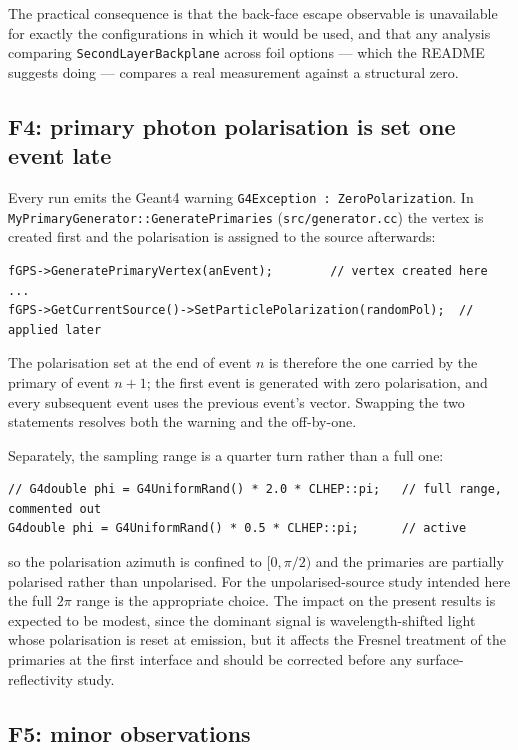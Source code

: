 \documentclass[a4paper,11pt]{article}
\begin{document}
The practical consequence is that the back-face escape observable is unavailable
for exactly the configurations in which it would be used, and that any analysis
comparing \texttt{SecondLayerBackplane} across foil options --- which the README
suggests doing --- compares a real measurement against a structural zero.

\subsection{F4: primary photon polarisation is set one event late}
\label{sec:f4}

Every run emits the Geant4 warning \texttt{G4Exception : ZeroPolarization}.
In \texttt{MyPrimaryGenerator::GeneratePrimaries}
(\texttt{src/generator.cc}) the vertex is created first and the polarisation is
assigned to the source afterwards:

\begin{lstlisting}
fGPS->GeneratePrimaryVertex(anEvent);        // vertex created here
...
fGPS->GetCurrentSource()->SetParticlePolarization(randomPol);  // applied later
\end{lstlisting}

The polarisation set at the end of event $n$ is therefore the one carried by the
primary of event $n+1$; the first event is generated with zero polarisation, and
every subsequent event uses the previous event's vector. Swapping the two
statements resolves both the warning and the off-by-one.

Separately, the sampling range is a quarter turn rather than a full one:

\begin{lstlisting}
// G4double phi = G4UniformRand() * 2.0 * CLHEP::pi;   // full range, commented out
G4double phi = G4UniformRand() * 0.5 * CLHEP::pi;      // active
\end{lstlisting}

so the polarisation azimuth is confined to $[0,\pi/2)$ and the primaries are
partially polarised rather than unpolarised. For the unpolarised-source study
intended here the full $2\pi$ range is the appropriate choice. The impact on the
present results is expected to be modest, since the dominant signal is
wavelength-shifted light whose polarisation is reset at emission, but it affects
the Fresnel treatment of the primaries at the first interface and should be
corrected before any surface-reflectivity study.

\subsection{F5: minor observations}
\label{sec:f5}
\end{document}

